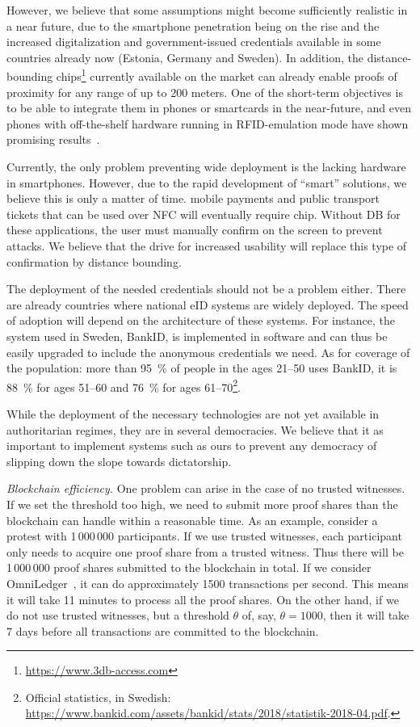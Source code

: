 However, we believe that some assumptions might become sufficiently realistic in a near future, due to the smartphone penetration being on the rise and the increased digitalization and government-issued credentials available in some countries already now (\eg Estonia, Germany and Sweden).
In addition, the distance-bounding chips\footnote{\url{https://www.3db-access.com}} currently available on the market can already enable proofs of proximity for any range of up to 200 meters.
One of the short-term objectives is to be able to integrate them in phones or smartcards in the near-future, and even phones with off-the-shelf hardware running in RFID-emulation mode have shown promising results~\cite{DBonSmartphones}.

Currently, the only problem preventing wide deployment is the lacking hardware 
in smartphones.
However, due to the rapid development of \enquote{smart} solutions, we believe 
this is only a matter of time.
\Eg mobile payments and public transport tickets that can be used over \ac{NFC} 
will eventually require  chip.
Without \ac{DB} for these applications, the user must manually confirm on the 
screen to prevent attacks.
We believe that the drive for increased usability will replace this type of 
confirmation by distance bounding.

The deployment of the needed credentials should not be a problem either.
There are already countries where national \ac{eID} systems are widely deployed.
The speed of adoption will depend on the architecture of these systems.
For instance, the system used in Sweden, BankID, is implemented in software and 
can thus be easily upgraded to include the anonymous credentials we need.
As for coverage of the population: more than \SI{95}{\%} of people in the ages 
21--50 uses BankID, it is \SI{88}{\%} for ages 51--60 and \SI{76}{\%} for ages 
61--70\footnote{%
  Official statistics, in Swedish:
  \url{https://www.bankid.com/assets/bankid/stats/2018/statistik-2018-04.pdf}.
}.

While the deployment of the necessary technologies are not yet available in 
authoritarian regimes, they are in several democracies.
We believe that it as important to implement systems such as ours to prevent any 
democracy of slipping down the slope towards dictatorship.

\emph{Blockchain efficiency.}
One problem can arise in the case of no trusted witnesses.
If we set the threshold too high, we need to submit more proof shares than the 
blockchain can handle within a reasonable time.
As an example, consider a protest with 1\,000\,000 participants.
If we use trusted witnesses, each participant only needs to acquire one proof 
share from a trusted witness.
Thus there will be 1\,000\,000 proof shares submitted to the blockchain in 
total.
If we consider OmniLedger~\cite{OmniLedger}, it can do approximately 1500 
transactions per second.
This means it will take 11 minutes to process all the proof shares.
On the other hand, if we do not use trusted witnesses, but a threshold 
\(\theta\) of, say, \(\theta = 1000\), then it will take 7 days before all 
transactions are committed to the blockchain.


